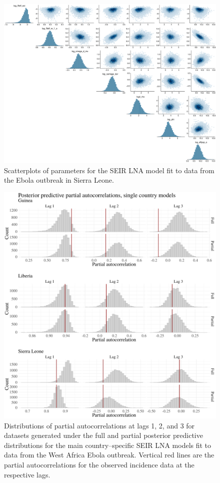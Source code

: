\begin{figure}[htbp]
	\centering
	\includegraphics[width=\linewidth]{figures/sln_tight_pairs}
	\caption{Scatterplots of parameters for the SEIR LNA model fit to data from the Ebola outbreak in Sierra Leone.}
	\label{fig:sierraleonepairs}
\end{figure}

\begin{figure}[htbp]
	\begin{fullpage}
		\centering
		\includegraphics[width=0.8\linewidth]{figures/ebola_single_pacfs}
		\caption[Posterior predictive distributions of partial autocorrelations for the main country--specific SEIR LNA models fit to data from the West Africa Ebola outbreak.]{Distributions of partial autocorrelations at lags 1, 2, and 3 for datasets generated under the full and partial posterior predictive distributions for the main country--specific SEIR LNA models fit to data from the West Africa Ebola outbreak. Vertical red lines are the partial autocorrelations for the observed incidence data at the respective lags.}
		\label{fig:ebola_single_pacfs}
	\end{fullpage}
\end{figure}

